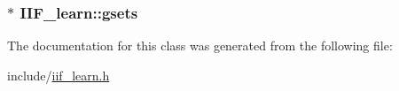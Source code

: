 \subsubsection[{gsets}]{$\ast$ I\+I\+F\+\_\+learn\+::gsets\hspace{0.3cm}{\ttfamily [protected]}}\hypertarget{classIIF__learn_a2c2157269ef33cd2881ed48c5b38946a}{}\label{classIIF__learn_a2c2157269ef33cd2881ed48c5b38946a}


The documentation for this class was generated from the following file\+:\begin{DoxyCompactItemize}
\item 
include/\hyperlink{iif__learn_8h}{iif\+\_\+learn.\+h}\end{DoxyCompactItemize}
